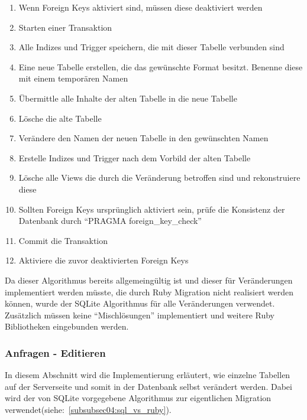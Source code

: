 \begin{enumerate}\label{enum:sql_algo}
    \item Wenn Foreign Keys aktiviert sind, müssen diese deaktiviert werden
    \item Starten einer Transaktion
    \item Alle Indizes und Trigger speichern, die mit dieser Tabelle verbunden sind
    \item Eine neue Tabelle erstellen, die das gewünschte Format besitzt. Benenne diese mit einem temporären Namen
    \item Übermittle alle Inhalte der alten Tabelle in die neue Tabelle
    \item Lösche die alte Tabelle
    \item Verändere den Namen der neuen Tabelle in den gewünschten Namen
    \item Erstelle Indizes und Trigger nach dem Vorbild der alten Tabelle
    \item Lösche alle Views die durch die Veränderung betroffen sind und rekonstruiere diese
    \item Sollten Foreign Keys ursprünglich aktiviert sein, prüfe die Konsistenz der Datenbank durch ``PRAGMA foreign\_key\_check''
    \item Commit die Transaktion
    \item Aktiviere die zuvor deaktivierten Foreign Keys
\end{enumerate}

Da dieser Algorithmus bereits allgemeingültig ist und dieser für Veränderungen implementiert werden müsste, die durch Ruby Migration nicht realisiert werden können, wurde der SQLite Algorithmus für alle Veränderungen verwendet. Zusätzlich müssen keine ``Mischlösungen'' implementiert und weitere Ruby Bibliotheken eingebunden werden.    

\subsubsection{Anfragen - Editieren}
\label{subsubsec04:anfragen_editor_edit}
In diesem Abschnitt wird die Implementierung erläutert, wie einzelne Tabellen auf der Serverseite und somit in der Datenbank selbst verändert werden. Dabei wird der von SQLite vorgegebene Algorithmus zur eigentlichen Migration verwendet(siehe:~\ref{subsubsec04:sql_vs_ruby}).

